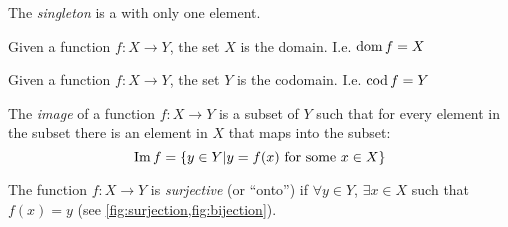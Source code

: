 \begin{definition}[Singleton]
\label{def:singleton_set} 
The \textit{singleton} is a  with only one element.
\end{definition}

\begin{example}[Domain]
  \label{ex:domain_set}
  Given a function $f: X \to Y$, the set $X$ is the domain. I.e. $\operatorname{dom}
  f = X$
\end{example}

\begin{example}[Codomain]
  \label{ex:codomain_set}
  Given a function $f: X \to Y$, the set $Y$ is the codomain. I.e.
  $\operatorname{cod} f = Y$
\end{example}

\begin{definition}[Image]
\label{def:function_image} 
The \textit{image} of a function $f: X \to Y$ is a subset of
 $Y$ such that for every element in the subset
there is an element in  $X$ that maps into the
subset:
\[
\operatorname{Im}{f} = \{y \in Y| y = f(x) \mbox{ for some } x \in X\}
\]
\end{definition}


\begin{definition}[Surjection]
  \label{def:surjection}
  The function $f: X \rightarrow Y$ is \textit{surjective} (or ``onto'') if
  $\forall y \in Y$, $\exists x \in X$ such that
  $f\left(x\right) = y$ (see \cref{fig:surjection,fig:bijection}).
\end{definition}

